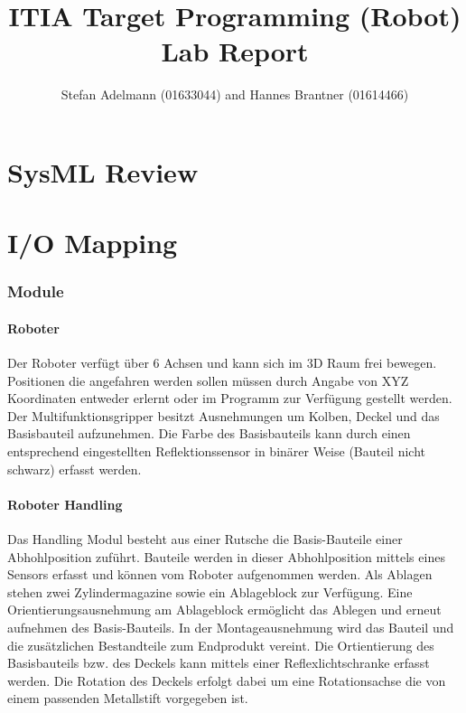 \documentclass{article}
\title{ITIA Target Programming (Robot) Lab Report}
\author{Stefan Adelmann (01633044) and Hannes Brantner (01614466)}
\begin{document}
\maketitle{}
\clearpage{}
\section{SysML Review}

\section{I/O Mapping}

\subsubsection{Module}
\paragraph{Roboter}
Der Roboter verfügt über 6 Achsen und kann sich im 3D Raum frei bewegen. Positionen die angefahren werden sollen müssen durch Angabe von XYZ Koordinaten entweder erlernt oder im Programm zur Verfügung gestellt werden. Der Multifunktionsgripper besitzt Ausnehmungen um Kolben, Deckel und das Basisbauteil aufzunehmen. Die Farbe des Basisbauteils kann durch einen entsprechend eingestellten Reflektionssensor in binärer Weise (Bauteil nicht schwarz) erfasst werden.

\paragraph{Roboter Handling}
Das Handling Modul besteht aus einer Rutsche die Basis-Bauteile einer Abhohlposition zuführt. Bauteile werden in dieser Abhohlposition mittels eines Sensors erfasst und können vom Roboter aufgenommen werden. Als Ablagen stehen zwei Zylindermagazine sowie ein Ablageblock zur Verfügung.\newline
Eine Orientierungsausnehmung am Ablageblock ermöglicht das Ablegen und erneut aufnehmen des Basis-Bauteils. In der Montageausnehmung wird das Bauteil und die zusätzlichen Bestandteile zum Endprodukt vereint. \newline
Die Ortientierung des Basisbauteils bzw. des Deckels kann mittels einer Reflexlichtschranke erfasst werden. Die Rotation des Deckels erfolgt dabei um eine Rotationsachse die von einem passenden Metallstift vorgegeben ist.
\end{document}
